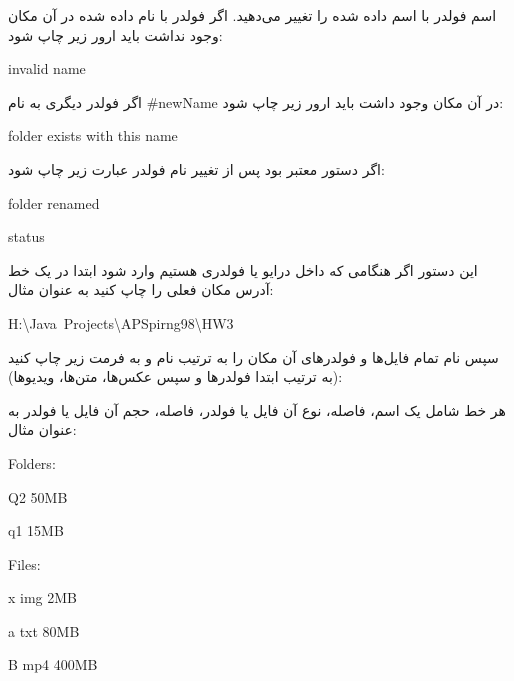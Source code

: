 \documentclass[]{article}
\begin{document}
اسم فولدر با اسم داده شده را تغییر می‌دهید.
اگر فولدر با نام داده شده در آن مکان وجود نداشت باید ارور زیر چاپ شود:

\begin{tcolorbox}[boxrule=0pt]
	\begin{latin}
  	  \large{
  	invalid name
		}
	\end{latin}
\end{tcolorbox}

اگر فولدر دیگری به نام \#newName در آن مکان وجود داشت باید ارور زیر چاپ شود:


\begin{tcolorbox}[boxrule=0pt]
	\begin{latin}
  	  \large{
  	folder exists with this name
		}
	\end{latin}
\end{tcolorbox}

اگر دستور معتبر بود پس از تغییر نام فولدر عبارت زیر چاپ شود:

\begin{tcolorbox}[boxrule=0pt]
	\begin{latin}
  	  \large{
  	folder renamed
		}
	\end{latin}
\end{tcolorbox}



\begin{tcolorbox}[boxrule=0pt]
	\begin{latin}
  	  \large{
  	status
		}
	\end{latin}
\end{tcolorbox}


این دستور اگر هنگامی که داخل درایو یا فولدری هستیم وارد شود ابتدا در یک خط آدرس مکان فعلی را چاپ کنید به عنوان مثال:

\begin{tcolorbox}[boxrule=0pt]
	\begin{latin}
  	  \large{
  	H:\textbackslash Java‍~Projects\textbackslash  APSpirng98\textbackslash HW3
		}
	\end{latin}
\end{tcolorbox}

 
سپس نام تمام فایل‌ها و فولدرهای آن مکان را به ترتیب نام و به فرمت زیر چاپ کنید (به ترتیب ابتدا فولدرها و سپس عکس‌ها، متن‌ها، ویدیوها):

هر خط شامل یک اسم، فاصله، نوع آن فایل یا فولدر، فاصله، حجم آن فایل یا فولدر
به عنوان مثال:

\begin{tcolorbox}[boxrule=0pt]
	\begin{latin}
  	  \large{
  Folders:
  
Q2 50MB

q1 15MB

Files:

x img 2MB

a txt 80MB

B mp4 400MB
		}
	\end{latin}
\end{tcolorbox}
\end{document}
